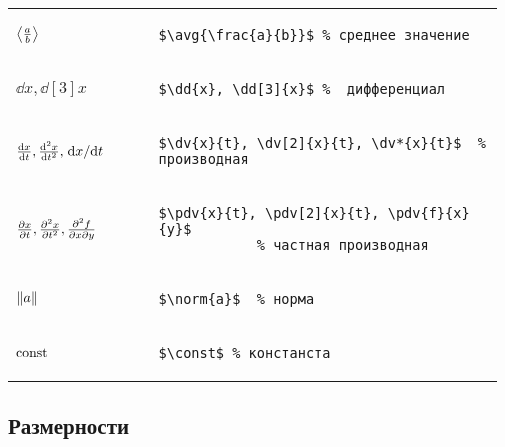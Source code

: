 \noindent
\begin{tabular}{C{0.28\linewidth} C{0.685\linewidth}}
    \vspace{-10pt}$\left\langle {\frac{a}{b}} \right\rangle$ &
        \begin{lstlisting}[style = listtable, gobble = 10]
            $\avg{\frac{a}{b}}$ % среднее значение
        \end{lstlisting} \\
    $\dd{x}, \dd[3]{x}$ &
        \begin{lstlisting}[style = listtable, gobble = 10]
            $\dd{x}, \dd[3]{x}$ %  дифференциал
        \end{lstlisting} \\
    \vspace{-10pt}$\dv{x}{t}, \dv[2]{x}{t}, \dv*{x}{t}$ &
        \begin{lstlisting}[style = listtable, gobble = 10]
            $\dv{x}{t}, \dv[2]{x}{t}, \dv*{x}{t}$  % производная
        \end{lstlisting} \\
    \vspace{-10pt}$\pdv{x}{t}, \pdv[2]{x}{t}, \pdv{f}{x}{y}$ &
        \begin{lstlisting}[style = listtable, gobble = 10]
            $\pdv{x}{t}, \pdv[2]{x}{t}, \pdv{f}{x}{y}$
            % частная производная
        \end{lstlisting} \\
    $\norm{a}$ &
        \begin{lstlisting}[style = listtable, gobble = 10]
            $\norm{a}$  % норма
        \end{lstlisting} \\
    $\mathrm{const}$ &
        \begin{lstlisting}[style = listtable, gobble = 10]
            $\const$ % констанста
        \end{lstlisting} \\
\end{tabular}



\subsection{Размерности}

\def\arraystretch{-500}

